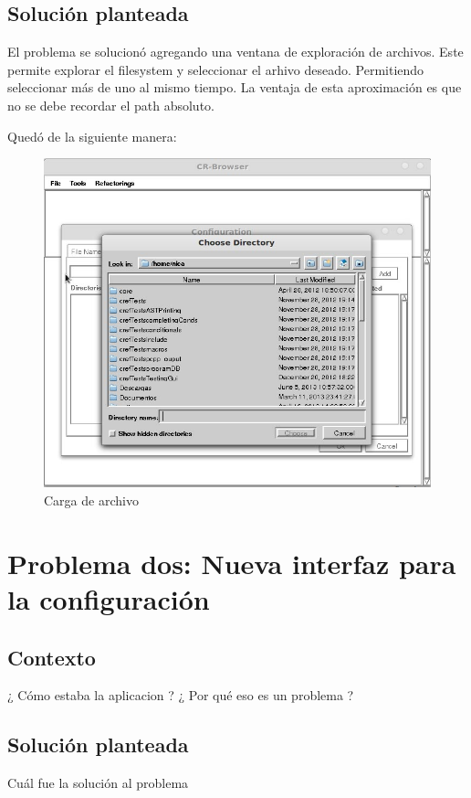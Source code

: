 \documentclass[a4paper,oneside,10pt]{article}
\begin{document}
\subsection{Soluci\'on planteada}
El problema se solucion\'o agregando una ventana de exploraci\'on de archivos. Este permite explorar el filesystem y seleccionar el arhivo deseado. Permitiendo seleccionar m\'as de uno al mismo tiempo.
La ventaja de esta aproximaci\'on es que no se debe recordar el path absoluto.

Qued\'o de la siguiente manera:

\begin{figure}[h!]
  \centering
    \includegraphics[scale=0.50]{images/codigo_modificado/seleccionar_directorio.jpg}
     \caption{Carga de archivo}
\end{figure}

\section{Problema dos: Nueva interfaz para la configuraci\'on}

\subsection{Contexto}
¿ C\'omo estaba la aplicacion ? ¿ Por qu\'e eso es un problema ?

\subsection{Soluci\'on planteada}
Cu\'al fue la soluci\'on al problema
\end{document}
